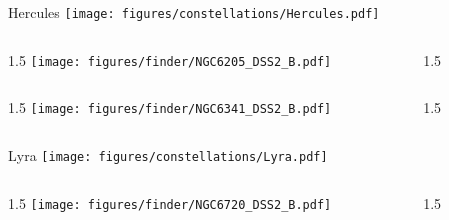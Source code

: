 \documentclass[final]{beamer}
\newlength{\colwidth}
\begin{document}

\begin{frame}[t]{\LARGE Hercules}
  \centering
  \texttt{[image: figures/constellations/Hercules.pdf]}
\end{frame}


\begin{frame}[t]{}
  \begin{columns}[T]
    \begin{column}{1.5\colwidth}
      \centering
      \texttt{[image: figures/finder/NGC6205\_DSS2\_B.pdf]}
    \end{column}
    \begin{column}{1.5\colwidth}
      \Large
      
    \end{column}
  \end{columns}
  \vspace{\fill}
  \begin{columns}[T]
    \begin{column}{1.5\colwidth}
      \centering
      \texttt{[image: figures/finder/NGC6341\_DSS2\_B.pdf]}
    \end{column}
    \begin{column}{1.5\colwidth}
      \Large
      
    \end{column}
  \end{columns}
\end{frame}


\begin{frame}[t]{\LARGE Lyra}
  \centering
  \texttt{[image: figures/constellations/Lyra.pdf]}
\end{frame}


\begin{frame}[t]{}
  \begin{columns}[T]
    \begin{column}{1.5\colwidth}
      \centering
      \texttt{[image: figures/finder/NGC6720\_DSS2\_B.pdf]}
    \end{column}
    \begin{column}{1.5\colwidth}
      \Large
      
    \end{column}
  \end{columns}
  \vspace{\fill}
\end{frame}
\end{document}
